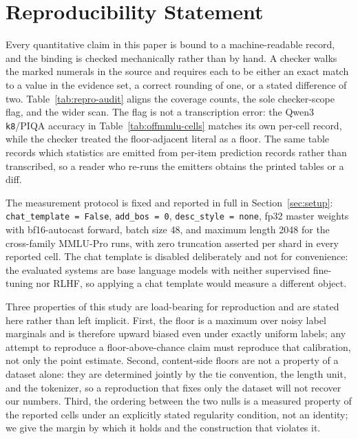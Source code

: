 \section*{Reproducibility Statement}

Every quantitative claim in this paper is bound to a machine-readable record, and the
binding is checked mechanically rather than by hand. A checker walks the marked numerals in the
source and requires each to be either an exact match to a value in the evidence set, a
correct rounding of one, or a stated difference of two. Table~\ref{tab:repro-audit} aligns the
coverage counts, the sole checker-scope flag, and the wider scan. The flag is not a transcription
error: the Qwen3 \texttt{k8}/PIQA accuracy in Table~\ref{tab:offmmlu-cells} matches its own per-cell
record, while the checker treated the floor-adjacent literal as a floor. The same table records
which statistics are emitted from per-item prediction records rather than transcribed, so a reader
who re-runs the emitters obtains the printed tables or a diff.



The measurement protocol is fixed and reported in full in
Section~\ref{sec:setup}: \texttt{chat\_template = False}, \texttt{add\_bos = 0},
\texttt{desc\_style = none}, fp32 master weights with bf16-autocast forward, batch size 48,
and maximum length 2048 for the cross-family MMLU-Pro runs, with zero truncation asserted
per shard in every reported cell. The chat template is disabled deliberately and not for
convenience: the evaluated systems are base language models with neither supervised
fine-tuning nor RLHF, so applying a chat template would measure a different object.

Three properties of this study are load-bearing for reproduction and are stated here
rather than left implicit. First, the floor is a maximum over noisy label marginals and is
therefore upward biased even under exactly uniform labels; any attempt to reproduce a
floor-above-chance claim must reproduce that calibration, not only the point estimate.
Second, content-side floors are not a property of a dataset alone: they are determined
jointly by the tie convention, the length unit, and the tokenizer, so a reproduction that
fixes only the dataset will not recover our numbers. Third, the ordering between the two
nulls is a measured property of the reported cells under an explicitly stated regularity
condition, not an identity; we give the margin by which it holds and the construction that
violates it.

